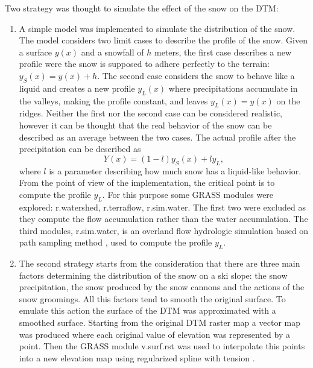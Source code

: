 \documentclass[12pt,a4paper,twoside]{book}
\begin{document}
Two strategy was thought to simulate the effect of the snow on the DTM:
\begin{enumerate}
\item A simple model was implemented to simulate the distribution of the snow. The model considers two limit cases to describe the profile of the snow. Given a surface $y(x)$ and a snowfall of $h$ meters, the first case describes a new profile were the snow is supposed to adhere perfectly to the terrain: $y_S(x)=y(x)+h$. The second case considers the snow to behave like a liquid and creates a new profile $y_L(x)$ where precipitations accumulate in the valleys, making the profile constant, and leaves $y_L(x)=y(x)$ on the ridges. Neither the first nor the second case can be considered realistic, however it can be thought that the real behavior of the snow can be described as an average between the two cases. The actual profile after the precipitation can be described as
\begin{equation}
Y(x)=(1-l)y_S(x)+ly_L,
\end{equation}
where $l$ is a parameter describing how much snow has a liquid-like behavior. From the point of view of the implementation, the critical point is to compute the profile $y_L$. For this purpose some GRASS modules were explored: r.watershed, r.terraflow, r.sim.water. The first two were excluded as they compute the flow accumulation rather than the water accumulation. The third modules, r.sim.water, is an overland flow hydrologic simulation based on path sampling method \cite{mit2004}, used to compute the profile $y_L$.
\item The second strategy  starts from the consideration that there are three main factors determining the distribution of the snow on a ski slope: the snow precipitation, the snow produced by the snow cannons and the actions of the snow groomings. All this factors tend to smooth the original surface. To emulate this action the surface of the DTM was approximated with a smoothed surface. Starting from the original DTM raster map a vector map was produced where each original value of elevation was represented by a point. Then the GRASS module v.surf.rst was used to interpolate this points into a new elevation map using regularized spline with tension \cite{mit2005}.
\end{enumerate}
\end{document}
